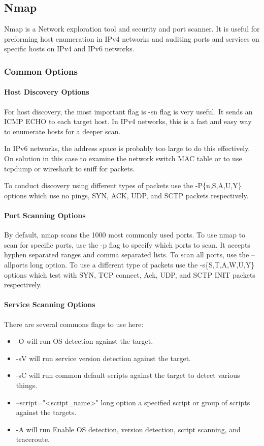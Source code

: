 \subsection{Nmap}
Nmap is a Network exploration tool and security and port scanner.
It is useful for preforming host enumeration in IPv4 networks and auditing ports and services on specific hosts on IPv4 and IPv6 networks.

\subsubsection{Common Options}


\paragraph{Host Discovery Options}
For host discovery, the most important flag is -sn flag is very useful.
It sends an ICMP ECHO to each target host.
In IPv4 networks, this is a fast and easy way to enumerate hosts for a deeper scan.

In IPv6 networks, the address space is probably too large to do this effectively.
On solution in this case to examine the network switch MAC table or to use tcpdump or wireshark to sniff for packets.

To conduct discovery using different types of packets use the -P\{n,S,A,U,Y\} options which use no pings, SYN, ACK, UDP, and SCTP packets respectively.

\paragraph{Port Scanning Options}
By default, nmap scans the 1000 most commonly used ports.
To use nmap to scan for specific ports, use the -p flag to specify which ports to scan.
It accepts hyphen separated ranges and comma separated lists.  
To scan all ports, use the --allports long option.
To use a different type of packets use the -s\{S,T,A,W,U,Y\} options which test with SYN, TCP connect, Ack, UDP, and SCTP INIT  packets respectively.

\paragraph{Service Scanning Options}
There are several commons flags to use here:
\begin{itemize}
	\item -O will run OS detection against the target.
	\item -sV will run service version detection against the target.
	\item -sC will run common default scripts against the target to detect various things.
	\item --script="<script\_name>" long option a specified script or group of scripts against the targets.
	\item -A will run Enable OS detection, version detection, script scanning, and traceroute.
\end{itemize}

